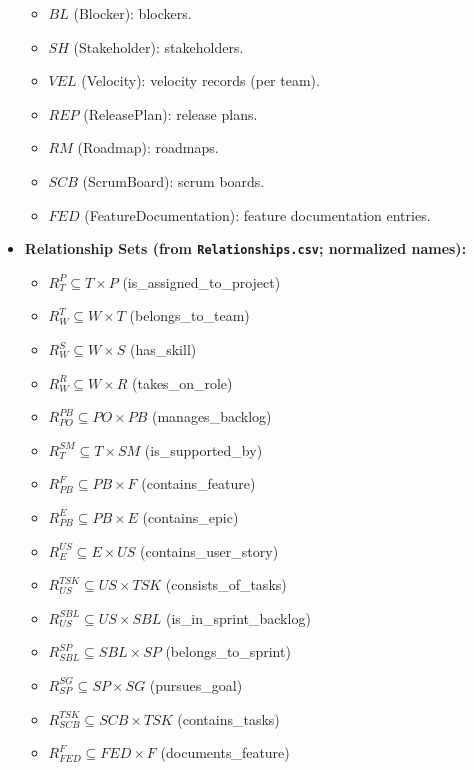 \documentclass[11pt,a4paper]{article}
\begin{document}
\begin{itemize}[leftmargin=2em]
\begin{itemize}
    \item $BL$ (\textsf{Blocker}): blockers.
    \item $SH$ (\textsf{Stakeholder}): stakeholders.
    \item $VEL$ (\textsf{Velocity}): velocity records (per team).
    \item $REP$ (\textsf{ReleasePlan}): release plans.
    \item $RM$ (\textsf{Roadmap}): roadmaps.
    \item $SCB$ (\textsf{ScrumBoard}): scrum boards.
    \item $FED$ (\textsf{FeatureDocumentation}): feature documentation entries.
  \end{itemize}

\item \textbf{Relationship Sets (from \texttt{Relationships.csv}; normalized names):}
  \begin{itemize}
    \item $R^{P}_{T} \subseteq T \times P$ (\textsf{is\_assigned\_to\_project})
    \item $R^{T}_{W} \subseteq W \times T$ (\textsf{belongs\_to\_team})
    \item $R^{S}_{W} \subseteq W \times S$ (\textsf{has\_skill})
    \item $R^{R}_{W} \subseteq W \times R$ (\textsf{takes\_on\_role})
    \item $R^{PB}_{PO} \subseteq PO \times PB$ (\textsf{manages\_backlog})
    \item $R^{SM}_{T} \subseteq T \times SM$ (\textsf{is\_supported\_by})
    \item $R^{F}_{PB} \subseteq PB \times F$ (\textsf{contains\_feature})
    \item $R^{E}_{PB} \subseteq PB \times E$ (\textsf{contains\_epic})
    \item $R^{US}_{E} \subseteq E \times US$ (\textsf{contains\_user\_story})
    \item $R^{TSK}_{US} \subseteq US \times TSK$ (\textsf{consists\_of\_tasks})
    \item $R^{SBL}_{US} \subseteq US \times SBL$ (\textsf{is\_in\_sprint\_backlog})
    \item $R^{SP}_{SBL} \subseteq SBL \times SP$ (\textsf{belongs\_to\_sprint})
    \item $R^{SG}_{SP} \subseteq SP \times SG$ (\textsf{pursues\_goal})
    \item $R^{TSK}_{SCB} \subseteq SCB \times TSK$ (\textsf{contains\_tasks})
    \item $R^{F}_{FED} \subseteq FED \times F$ (\textsf{documents\_feature})

\end{itemize}
\end{itemize}
\end{document}
